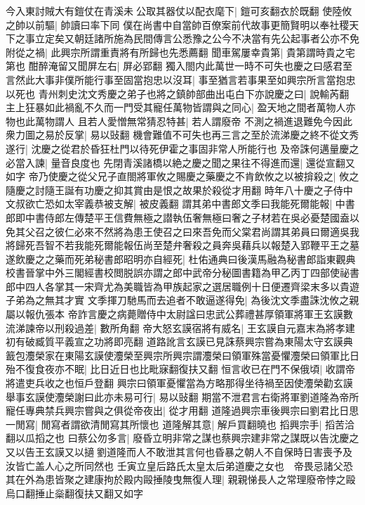 今入東討賊大有鎧仗在青溪未公取其器仗以配衣麾下|{
	鎧可亥翻衣於既翻}
使陸攸之帥以前驅|{
	帥讀曰率下同}
僕在尚書中自當帥百僚案前代故事更簡賢明以奉社稷天下之事立定矣又朝廷諸所施為民間傳言公悉豫之公今不决當有先公起事者公亦不免附從之禍|{
	此興宗所謂重責將有所歸也先悉薦翻}
聞車駕屢幸貴第|{
	貴第謂時貴之宅第也}
酣醉淹留又聞屏左右|{
	屏必郢翻}
獨入閤内此萬世一時不可失也慶之曰感君至言然此大事非僕所能行事至固當抱忠以沒耳|{
	事至猶言若事果至如興宗所言當抱忠以死也}
青州刺史沈文秀慶之弟子也將之鎮帥部曲出屯白下亦說慶之曰|{
	說輸芮翻}
主上狂暴如此禍亂不久而一門受其寵任萬物皆謂與之同心|{
	盈天地之間者萬物人亦物也此萬物謂人}
且若人愛憎無常猜忍特甚|{
	若人謂廢帝}
不測之禍進退難免今因此衆力圖之易於反掌|{
	易以䜴翻}
機會難值不可失也再三言之至於流涕慶之終不從文秀遂行|{
	沈慶之從君於昏狂杜門以待死伊霍之事固非常人所能行也}
及帝誅何邁量慶之必當入諫|{
	量音良度也}
先閉青溪諸橋以絶之慶之聞之果往不得進而還|{
	還從宣翻又如字}
帝乃使慶之從父兄子直閤將軍攸之賜慶之藥慶之不肯飲攸之以被揜殺之|{
	攸之隨慶之討隨王誕有功慶之抑其賞由是恨之故果於殺從才用翻}
時年八十慶之子侍中文叔欲亡恐如太宰義恭被支解|{
	被皮義翻}
謂其弟中書郎文季曰我能死爾能報|{
	中書郎即中書侍郎左傳楚平王信費無極之譛執伍奢無極曰奢之子材若在吳必憂楚國盍以免其父召之彼仁必來不然將為患王使召之曰來吾免而父棠君尚謂其弟員曰爾適吳我將歸死吾智不若我能死爾能報伍尚至楚弁奢殺之員奔吳藉兵以報楚入郢鞭平王之墓}
遂飲慶之之藥而死弟秘書郎昭明亦自經死|{
	杜佑通典曰後漢馬融為秘書郎詣東觀典校書晉掌中外三閣經書校閲脱誤亦謂之郎中武帝分秘圖書籍為甲乙丙丁四部使祕書郎中四人各掌其一宋齊尤為美職皆為甲族起家之選居職例十日便遷齊梁末多以貴遊子弟為之無其才實}
文季揮刀馳馬而去追者不敢逼遂得免|{
	為後沈文季盡誅沈攸之親屬以報仇張本}
帝詐言慶之病薨贈侍中太尉諡曰忠武公葬禮甚厚領軍將軍王玄謨數流涕諫帝以刑殺過差|{
	數所角翻}
帝大怒玄謨宿將有威名|{
	王玄謨自元嘉末為將孝建初有破臧質平義宣之功將即亮翻}
道路訛言玄謨已見誅蔡興宗嘗為東陽太守玄謨典籖包灋榮家在東陽玄謨使灋榮至興宗所興宗謂灋榮曰領軍殊當憂懼灋榮曰領軍比日殆不復食夜亦不眠|{
	比日近日也比毗寐翻復扶又翻}
恒言收已在門不保俄頃|{
	收謂帝將遣吏兵收之也恒戶登翻}
興宗曰領軍憂懼當為方略那得坐待禍至因使灋榮勸玄謨舉事玄謨使灋榮謝曰此亦未易可行|{
	易以䜴翻}
期當不泄君言右衛將軍劉道隆為帝所寵任專典禁兵興宗嘗與之俱從帝夜出|{
	從才用翻}
道隆過興宗車後興宗曰劉君比日思一閒寫|{
	閒寫者謂欲清閒寫其所懷也}
道隆解其意|{
	解戶買翻曉也}
搯興宗手|{
	搯苦洽翻以瓜搯之也}
曰蔡公勿多言|{
	廢昏立明非常之謀也蔡興宗建非常之謀既以告沈慶之又以告王玄謨又以擿劉道隆而人不敢泄其言何也昏暴之朝人不自保時日害喪予及汝皆亡盖人心之所同然也}
壬寅立皇后路氏太皇太后弟道慶之女也　帝畏忌諸父恐其在外為患皆聚之建康拘於殿内毆捶陵曳無復人理|{
	親親悌長人之常理廢帝悖之毆烏口翻捶止橤翻復扶又翻又如字}

